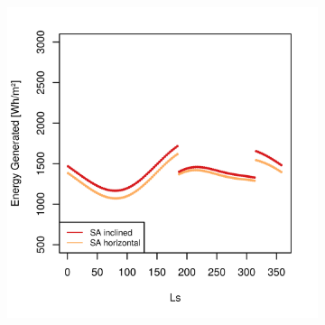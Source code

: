 \clearpage
\begin{figure}[h]
\captionsetup[subfigure]{justification=centering}
\vspace{-2ex}
	\centering
    \setlength{\subfigureWidth}{0.50\textwidth}
    \setlength{\graphicsHeight}{80mm}
    \hypersetup{hidelinks=true}%
    \begin{subfigure}[t]{\subfigureWidth}
        \centering
        \includegraphics[height=\graphicsHeight]{sections/design/solar-array/plots/ianichaos-daily-generated-energy.png}
        \label{fig:plot:sub:iani-chaos-generated-energy}
    \end{subfigure}\hfill
    \begin{subfigure}[t]{\subfigureWidth}
        \centering

\end{subfigure}
\end{figure}
